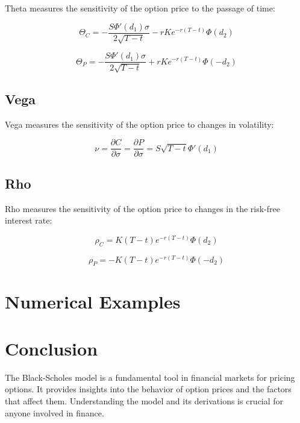 \documentclass[../main.tex]{subfiles}
\begin{document}
Theta measures the sensitivity of the option price to the passage of time:

\begin{equation}
    \Theta_C = -\frac{S \Phi'(d_1) \sigma}{2 \sqrt{T - t}} - r K e^{-r(T - t)} \Phi(d_2)
\end{equation}

\begin{equation}
    \Theta_P = -\frac{S \Phi'(d_1) \sigma}{2 \sqrt{T - t}} + r K e^{-r(T - t)} \Phi(-d_2)
\end{equation}

\subsection{Vega}

Vega measures the sensitivity of the option price to changes in volatility:

\begin{equation}
    \nu = \frac{\partial C}{\partial \sigma} = \frac{\partial P}{\partial \sigma} = S \sqrt{T - t} \Phi'(d_1)
\end{equation}

\subsection{Rho}

Rho measures the sensitivity of the option price to changes in the risk-free interest rate:

\begin{equation}
    \rho_C = K (T - t) e^{-r(T - t)} \Phi(d_2)
\end{equation}

\begin{equation}
    \rho_P = -K (T - t) e^{-r(T - t)} \Phi(-d_2)
\end{equation}


\section{Numerical Examples}



\section{Conclusion}

The Black-Scholes model is a fundamental tool in financial markets for pricing options. It provides insights into the behavior of option prices and the factors that affect them. Understanding the model and its derivations is crucial for anyone involved in finance.
\end{document}
